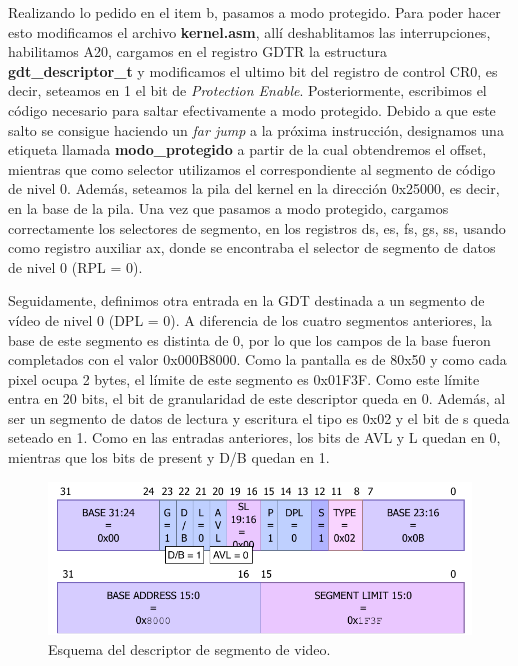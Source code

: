 \documentclass[a4paper]{article}
\begin{document}
\justify
Realizando lo pedido en el item b, pasamos a modo protegido. Para poder hacer esto modificamos el archivo \textbf{kernel.asm}, allí deshablitamos las interrupciones, habilitamos A20, cargamos en el registro GDTR la estructura \textbf{gdt_descriptor_t} y modificamos el ultimo bit del registro de control CR0, es decir, seteamos en 1 el bit de \textit{Protection Enable}. Posteriormente, escribimos el código necesario para saltar efectivamente a modo protegido. Debido a que este salto se consigue haciendo un \textit{far jump} a la próxima instrucción, designamos una etiqueta llamada \textbf{modo_protegido} a partir de la cual obtendremos el offset, mientras que como selector utilizamos el correspondiente al segmento de código de nivel 0. Además, seteamos la pila del kernel en la dirección 0x25000, es decir, en la base de la pila. Una vez que pasamos a modo protegido, cargamos correctamente los selectores de segmento, en los registros ds, es, fs, gs, ss, usando como registro auxiliar ax, donde se encontraba el selector de segmento de datos de nivel 0 (RPL = 0).


\justify
Seguidamente, definimos otra entrada en la GDT destinada a un segmento de vídeo de nivel 0 (DPL = 0). A diferencia de los cuatro segmentos anteriores, la base de este segmento es distinta de 0, por lo que los campos de la base fueron completados con el valor 0x000B8000. Como la pantalla es de 80x50 y como cada pixel ocupa 2 bytes, el límite de este segmento es 0x01F3F. Como este límite entra en 20 bits, el bit de granularidad de este descriptor queda en 0. Además, al ser un segmento de datos de lectura y escritura el tipo es 0x02 y el bit de s queda seteado en 1. Como en las entradas anteriores, los bits de AVL y L quedan en 0, mientras que los bits de present y D/B quedan en 1.  

\begin{figure}[h]
	\centering
	\includegraphics[scale=0.8]{img/DescriptorVideo.pdf}
	\caption{Esquema del descriptor de segmento de video.}
\end{figure}
\end{document}
